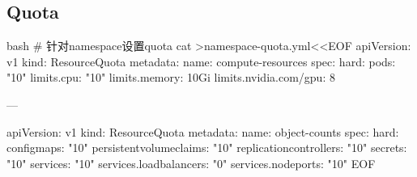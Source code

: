 \subsection{Quota}
\begin{code-block}{bash}
# 针对namespace设置quota
cat >namespace-quota.yml<<EOF
apiVersion: v1
kind: ResourceQuota
metadata:
  name: compute-resources
spec:
  hard:
    pods: "10"
    limits.cpu: "10"
    limits.memory: 10Gi
    limits.nvidia.com/gpu: 8

---

apiVersion: v1
kind: ResourceQuota
metadata:
  name: object-counts
spec:
  hard:
    configmaps: "10"
    persistentvolumeclaims: "10"
    replicationcontrollers: "10"
    secrets: "10"
    services: "10"
    services.loadbalancers: "0"
    services.nodeports: "10"
EOF
\end{code-block}